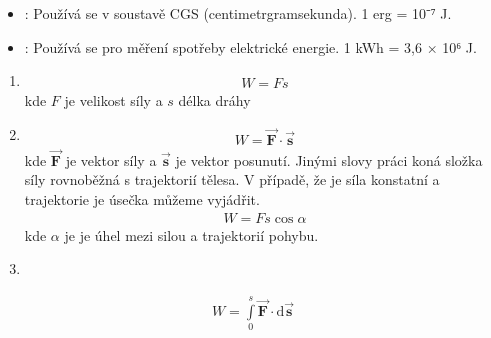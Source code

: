 \documentclass[letterpaper,10pt,english]{jupyterBook}
\begin{document}
\sphinxAtStartPar
{}
\begin{itemize}
\item {} 
\sphinxAtStartPar
{}: Používá se v soustavě CGS (centimetr\sphinxhyphen{}gram\sphinxhyphen{}sekunda). 1 erg = 10⁻⁷ J.

\item {} 
\sphinxAtStartPar
{}: Používá se pro měření spotřeby elektrické energie. 1 kWh = 3,6 × 10⁶ J.

\end{itemize}
\begin{enumerate}
%
\item {} 
\sphinxAtStartPar
{}
\begin{equation*}
\begin{split}W = F s \end{split}
\end{equation*}
\sphinxAtStartPar
kde \(F\) je velikost síly a \(s\) délka dráhy

\item {} 
\sphinxAtStartPar
{}
\begin{equation*}
\begin{split}W = \vec{\mathbf{F}} \cdot \vec{\mathbf{s}} \end{split}
\end{equation*}
\sphinxAtStartPar
kde \(\vec{\mathbf{F}}\) je vektor síly a \(\vec{\mathbf{s}}\) je vektor posunutí. Jinými slovy práci koná složka síly rovnoběžná s trajektorií tělesa. V případě, že je síla konstatní a trajektorie je úsečka můžeme vyjádřit.
\begin{equation*}
\begin{split}W = F s \cos \alpha\end{split}
\end{equation*}
\sphinxAtStartPar
kde \(\alpha\) je je úhel mezi silou a trajektorií pohybu.

\item {} 
\sphinxAtStartPar
{}

\end{enumerate}
\begin{equation*}
\begin{split}W = \int\limits_0^s \vec{\mathbf{F}} \cdot \mathrm{d}\vec{\mathbf{s}}  \end{split}
\end{equation*}
\end{document}

